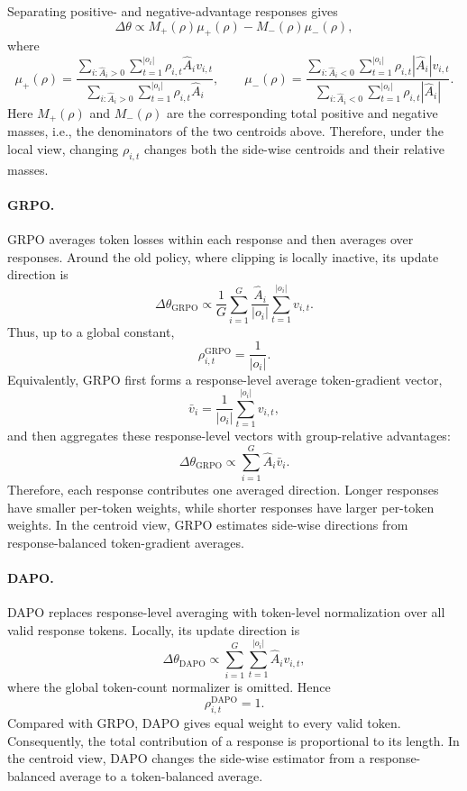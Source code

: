\documentclass{llmxive}
\begin{document}
Separating positive- and negative-advantage responses gives
\begin{equation}
\label{eq:generic-centroid-decomp}
\Delta\theta
\propto
M_+(\rho)\mu_+(\rho)
-
M_-(\rho)\mu_-(\rho),
\end{equation}
where
\begin{equation}
\label{eq:generic-centroids}
\mu_+(\rho)
=
\frac{
\sum_{i:\hat A_i>0}\sum_{t=1}^{|o_i|}
\rho_{i,t}\hat A_i v_{i,t}
}{
\sum_{i:\hat A_i>0}\sum_{t=1}^{|o_i|}
\rho_{i,t}\hat A_i
},
\qquad
\mu_-(\rho)
=
\frac{
\sum_{i:\hat A_i<0}\sum_{t=1}^{|o_i|}
\rho_{i,t}|\hat A_i| v_{i,t}
}{
\sum_{i:\hat A_i<0}\sum_{t=1}^{|o_i|}
\rho_{i,t}|\hat A_i|
}.
\end{equation}
Here \(M_+(\rho)\) and \(M_-(\rho)\) are the corresponding total positive and
negative masses, i.e., the denominators of the two centroids above. Therefore,
under the local view, changing \(\rho_{i,t}\) changes both the side-wise
centroids and their relative masses.

\paragraph{GRPO.}
GRPO averages token losses within each response and then averages over
responses. Around the old policy, where clipping is locally inactive, its update
direction is
\begin{equation}
\label{eq:grpo-local-centroid}
\Delta\theta_{\mathrm{GRPO}}
\propto
\frac{1}{G}
\sum_{i=1}^{G}
\frac{\hat A_i}{|o_i|}
\sum_{t=1}^{|o_i|}
v_{i,t}.
\end{equation}
Thus, up to a global constant,
\[
\rho_{i,t}^{\mathrm{GRPO}}=\frac{1}{|o_i|}.
\]
Equivalently, GRPO first forms a response-level average token-gradient vector,
\[
\bar v_i
=
\frac{1}{|o_i|}
\sum_{t=1}^{|o_i|}
v_{i,t},
\]
and then aggregates these response-level vectors with group-relative advantages:
\[
\Delta\theta_{\mathrm{GRPO}}
\propto
\sum_{i=1}^{G}\hat A_i \bar v_i.
\]
Therefore, each response contributes one averaged direction. Longer responses
have smaller per-token weights, while shorter responses have larger per-token
weights. In the centroid view, GRPO estimates side-wise directions from
response-balanced token-gradient averages.

\paragraph{DAPO.}
DAPO replaces response-level averaging with token-level normalization over all
valid response tokens. Locally, its update direction is
\begin{equation}
\label{eq:dapo-local-centroid}
\Delta\theta_{\mathrm{DAPO}}
\propto
\sum_{i=1}^{G}
\sum_{t=1}^{|o_i|}
\hat A_i v_{i,t},
\end{equation}
where the global token-count normalizer is omitted. Hence
\[
\rho_{i,t}^{\mathrm{DAPO}}=1.
\]
Compared with GRPO, DAPO gives equal weight to every valid token. Consequently,
the total contribution of a response is proportional to its length. In the
centroid view, DAPO changes the side-wise estimator from a response-balanced
average to a token-balanced average.
\end{document}
